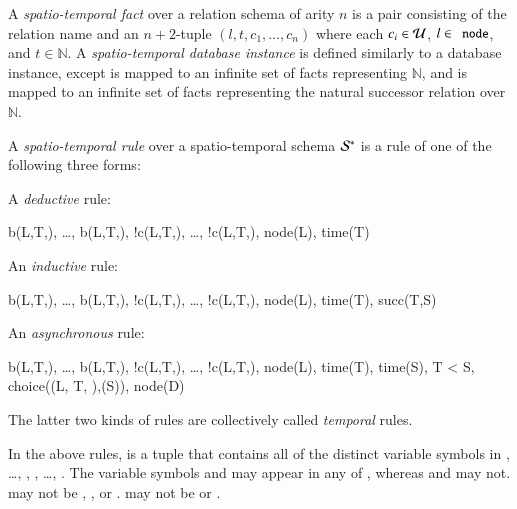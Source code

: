A {\em spatio-temporal fact} over a relation schema of arity $n$ is a pair consisting of the relation name and an $n+2$-tuple $(l,t,c_1,\ldots,c_n)$ where each $c_i \in \univ$, $l \in \dedalus{node}$, and $t \in \mathbb{N}$.  A {\em spatio-temporal database instance} is defined similarly to a database instance, except  is mapped to an infinite set of  facts representing $\mathbb{N}$, and  is mapped to an infinite set of  facts representing the natural successor relation over $\mathbb{N}$.

A {\em spatio-temporal rule} over a spatio-temporal schema $\stschema$ is a rule of one of the following three forms:

A {\em deductive} rule:

\begin{Drules}
        {b(L,T,), \ldots, b(L,T,), !c(L,T,), \ldots, !c(L,T,), node(L), time(T)}
\end{Drules}

An {\em inductive} rule:

\begin{Drules}
        {b(L,T,), \ldots, b(L,T,), !c(L,T,), \ldots, !c(L,T,), node(L), time(T), succ(T,S)}
\end{Drules}

An {\em asynchronous} rule:

\begin{Drules}
        {b(L,T,), \ldots, b(L,T,),
          !c(L,T,), \ldots, !c(L,T,),
          node(L), time(T), time(S), T < S, choice((L, T, ),(S)), node(D)}
\end{Drules}

The latter two kinds of rules are collectively called {\em temporal} rules.  

In the above rules,  is a tuple that contains all of the distinct variable
symbols in , \ldots, , , \ldots,
.  The variable symbols  and  may appear in
any of , whereas  and  may not.
 may not be , , or .
 may not be
 or .

